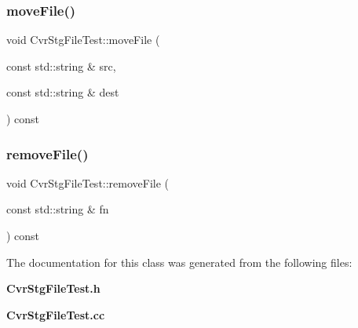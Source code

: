 \mbox{\label{classCvrStgFileTest_a94f814539db17c02ac3e4f70a3cd96eb}} 
\subsubsection{move\+File()}
{\footnotesize\ttfamily void Cvr\+Stg\+File\+Test\+::move\+File (\begin{DoxyParamCaption}\item[{const std\+::string \&}]{src,  }\item[{const std\+::string \&}]{dest }\end{DoxyParamCaption}) const\hspace{0.3cm}{\ttfamily [private]}}

\mbox{\label{classCvrStgFileTest_a20f92774fcd716209a45731a6b977f52}} 
\subsubsection{remove\+File()}
{\footnotesize\ttfamily void Cvr\+Stg\+File\+Test\+::remove\+File (\begin{DoxyParamCaption}\item[{const std\+::string \&}]{fn }\end{DoxyParamCaption}) const\hspace{0.3cm}{\ttfamily [private]}}



The documentation for this class was generated from the following files\+:\begin{DoxyCompactItemize}
\item 
\textbf{ Cvr\+Stg\+File\+Test.\+h}\item 
\textbf{ Cvr\+Stg\+File\+Test.\+cc}\end{DoxyCompactItemize}
